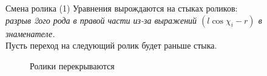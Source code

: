 \begin{frame}{Смена ролика}
    \textcolor{Periwinkle}{(1) Уравнения вырождаются на стыках роликов:}\\
    \textit{разрыв 2ого рода в правой части из-за выражений $(l\cos\chi_i-r)$ в знаменателе.} \\
    Пусть переход на следующий ролик будет раньше стыка.
    \begin{figure}
        \centering
        \caption{Ролики перекрываются}
    \end{figure}
\end{frame}
